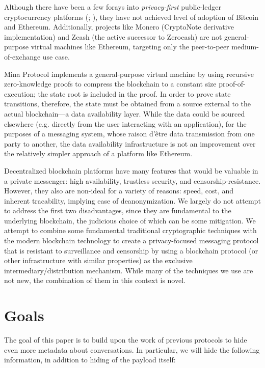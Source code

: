 Although there have been a few forays into \emph{privacy-first} public-ledger cryptocurrency platforms (\cite[CryptoNote:][]{saberhagen_cryptonote_2013}; \cite[Zerocash:][]{sasson_zerocash_2014}), they have not achieved level of adoption of Bitcoin and Ethereum. Additionally, projects like Monero (CryptoNote derivative implementation) and Zcash (the active successor to Zerocash) are not general-purpose virtual machines like Ethereum, targeting only the peer-to-peer medium-of-exchange use case.

Mina Protocol implements a general-purpose virtual machine by using recursive zero-knowledge proofs to compress the blockchain to a constant size proof-of-execution; the state root is included in the proof. \parencite{bonneau_mina_2020} In order to prove state transitions, therefore, the state must be obtained from a source external to the actual blockchain---a data availability layer. While the data could be sourced elsewhere (e.g. directly from the user interacting with an application), for the purposes of a messaging system, whose raison d'\^{e}tre data transmission from one party to another, the data availability infrastructure is not an improvement over the relatively simpler approach of a platform like Ethereum.

\bigskip

Decentralized blockchain platforms have many features that would be valuable in a private messenger: high availability, trustless security, and censorship-resistance. However, they also are non-ideal for a variety of reasons: speed, cost, and inherent tracability, implying ease of deanonymization. We largely do not attempt to address the first two disadvantages, since they are fundamental to the underlying blockchain, the judicious choice of which can be some mitigation. We attempt to combine some fundamental traditional cryptographic techniques with the modern blockchain technology to create a privacy-focused messaging protocol that is resistant to surveillance and censorship by using a blockchain protocol (or other infrastructure with similar properties) as the exclusive intermediary/distribution mechanism. While many of the techniques we use are not new, the combination of them in this context is novel.

\section{Goals}\label{goals}

The goal of this paper is to build upon the work of previous protocols to hide even more metadata about conversations. In particular, we will hide the following information, in addition to hiding of the payload itself:

